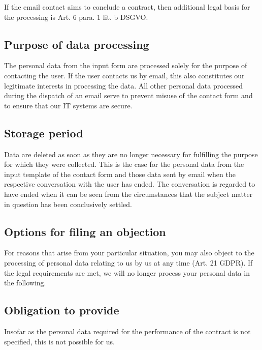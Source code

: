 \documentclass[letterpaper,10pt,english]{sphinxmanual}
\begin{document}
\sphinxAtStartPar
If the email contact aims to conclude a contract, then additional legal basis for the processing is Art. 6 para. 1 lit. b DSGVO.


\subsection{Purpose of data processing}
\label{\detokenize{policies/legal:purpose-of-data-processing}}
\sphinxAtStartPar
The personal data from the input form are processed solely for the purpose of contacting the user. If the user contacts us by email, this also constitutes our legitimate interests in processing the data.
All other personal data processed during the dispatch of an email serve to prevent misuse of the contact form and to ensure that our IT systems are secure.


\subsection{Storage period}
\label{\detokenize{policies/legal:storage-period}}
\sphinxAtStartPar
Data are deleted as soon as they are no longer necessary for fulfilling the purpose for which they were collected. This is the case for the personal data from the input template of the contact form and those data sent by email when the respective conversation with the user has ended. The conversation is regarded to have ended when it can be seen from the circumstances that the subject matter in question has been conclusively settled.


\subsection{Options for filing an objection}
\label{\detokenize{policies/legal:options-for-filing-an-objection}}
\sphinxAtStartPar
For reasons that arise from your particular situation, you may also object to the processing of personal data relating to us by us at any time (Art. 21 GDPR). If the legal requirements are met, we will no longer process your personal data in the following.


\subsection{Obligation to provide}
\label{\detokenize{policies/legal:obligation-to-provide}}
\sphinxAtStartPar
Insofar as the personal data required for the performance of the contract is not specified, this is not possible for us.
\end{document}
